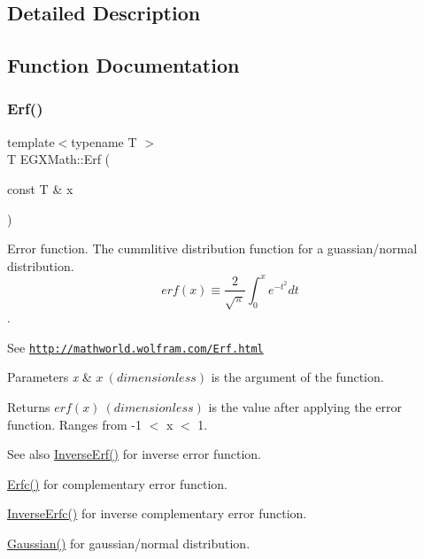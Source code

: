 \subsection{Detailed Description}


\subsection{Function Documentation}
\mbox{\label{group___e_g_x_math-_functions-_e_r_f_ga167bde890986906e6cd3b32adaa8e6a8}} 
\subsubsection{\texorpdfstring{Erf()}{Erf()}}
{\footnotesize\ttfamily template$<$typename T $>$ \\
T E\+G\+X\+Math\+::\+Erf (\begin{DoxyParamCaption}\item[{const T \&}]{x }\end{DoxyParamCaption})}



Error function. The cummlitive distribution function for a guassian/normal distribution. \[ erf(x)\equiv \frac{2}{\sqrt{\pi}}\int_0^x e^{-t^2}dt \]. 

See \href{http://mathworld.wolfram.com/Erf.html}{\tt http\+://mathworld.\+wolfram.\+com/\+Erf.\+html} 
\begin{DoxyParams}{Parameters}
{\em x} & $x\ (dimensionless)$ is the argument of the function. \\
\hline
\end{DoxyParams}
\begin{DoxyReturn}{Returns}
$erf(x)\ (dimensionless)$ is the value after applying the error function. Ranges from -\/1 $<$ x $<$ 1. 
\end{DoxyReturn}
\begin{DoxySeeAlso}{See also}
\mbox{\hyperlink{group___e_g_x_math-_functions-_e_r_f_gab7cacb258ac31ab3929204dc1ed93400}{Inverse\+Erf()}} for inverse error function. 

\mbox{\hyperlink{group___e_g_x_math-_functions-_e_r_f_ga58f76263d205c47000068176d3116571}{Erfc()}} for complementary error function. 

\mbox{\hyperlink{group___e_g_x_math-_functions-_e_r_f_gad1f81a581f9f2d66a1a4bad2578c3368}{Inverse\+Erfc()}} for inverse complementary error function. 

\mbox{\hyperlink{group___e_g_x_math-_functions-_gaussian_ga647b46315081e299edc16a1c7f4e4032}{Gaussian()}} for gaussian/normal distribution. 
\end{DoxySeeAlso}
\mbox{\label{group___e_g_x_math-_functions-_e_r_f_ga58f76263d205c47000068176d3116571}} 
